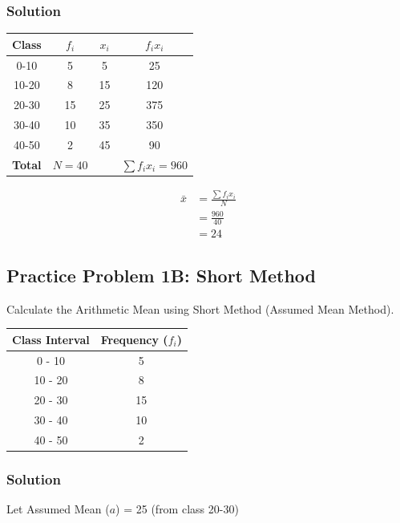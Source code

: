 \documentclass[12pt, a4paper]{article}
\begin{document}
\subsubsection*{Solution}
\begin{center}
\begin{tabular}{|c|c|c|c|}
\hline
\textbf{Class} & $f_i$ & $x_i$ & $f_i x_i$ \\ \hline
0-10 & 5 & 5 & 25 \\ \hline
10-20 & 8 & 15 & 120 \\ \hline
20-30 & 15 & 25 & 375 \\ \hline
30-40 & 10 & 35 & 350 \\ \hline
40-50 & 2 & 45 & 90 \\ \hline
\textbf{Total} & $N=40$ & & $\sum f_i x_i = 960$ \\ \hline
\end{tabular}
\end{center}

\begin{align*}
\bar{x} &= \frac{\sum f_i x_i}{N} \\
        &= \frac{960}{40} \\
        &= 24
\end{align*}

\hrulefill

\subsection*{Practice Problem 1B: Short Method}
Calculate the Arithmetic Mean using Short Method (Assumed Mean Method).
\begin{center}
\begin{tabular}{|c|c|}
\hline
\textbf{Class Interval} & \textbf{Frequency ($f_i$)} \\ \hline
0 - 10 & 5 \\ \hline
10 - 20 & 8 \\ \hline
20 - 30 & 15 \\ \hline
30 - 40 & 10 \\ \hline
40 - 50 & 2 \\ \hline
\end{tabular}
\end{center}

\subsubsection*{Solution}
Let Assumed Mean ($a$) = 25 (from class 20-30)
\end{document}
